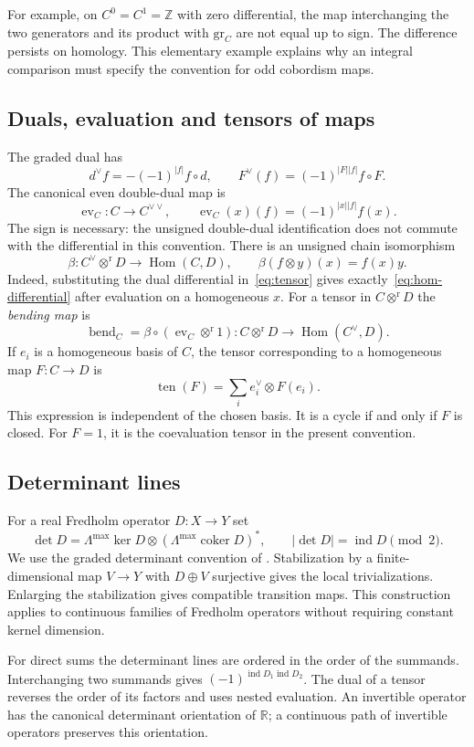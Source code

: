 \documentclass[11pt]{amsart}
\theoremstyle{definition}
\theoremstyle{remark}
\theoremstyle{plain}
\numberwithin{equation}{section}
\newcommand{\ZZ}{\mathbb Z}
\newcommand{\RR}{\mathbb R}
\newcommand{\eps}{\mathrm{gr}}
\newcommand{\ind}{\operatorname{ind}}
\newcommand{\coker}{\operatorname{coker}}
\newcommand{\Hom}{\operatorname{Hom}}
\newcommand{\ev}{\operatorname{ev}}
\newcommand{\ten}{\operatorname{ten}}
\begin{document}
For example, on $C^0=C^1=\ZZ$ with zero differential, the map
interchanging the two generators and its product with $\eps_C$
are not equal up to sign. The difference persists on homology.
This elementary example explains why an integral comparison
must specify the convention for odd cobordism maps.

\subsection{Duals, evaluation and tensors of maps}
The graded dual has
\[
 d^\vee f=-(-1)^{|f|}f\circ d,
 \qquad F^\vee(f)=(-1)^{|F||f|}f\circ F.
\]
The canonical even double-dual map is
\[
 \ev_C:C\longrightarrow C^{\vee\vee},\qquad
 \ev_C(x)(f)=(-1)^{|x||f|}f(x).
\]
The sign is necessary: the unsigned double-dual identification
does not commute with the differential in this convention.
There is an unsigned chain isomorphism
\begin{equation}\label{eq:beta}
 \beta:C^\vee\otimes^{\mathrm r} D\longrightarrow\Hom(C,D),\qquad
 \beta(f\otimes y)(x)=f(x)y.
\end{equation}
Indeed, substituting the dual differential in~\eqref{eq:tensor}
gives exactly~\eqref{eq:hom-differential} after evaluation on a
homogeneous $x$. For a tensor in $C\otimes^{\mathrm r} D$ the \emph{bending map} is
\[
 \operatorname{bend}_C=\beta\circ(\ev_C\otimes^{\mathrm r}1):
 C\otimes^{\mathrm r} D\longrightarrow\Hom(C^\vee,D).
\]
If $e_i$ is a homogeneous basis of $C$, the tensor corresponding
to a homogeneous map $F:C\to D$ is
\[
 \ten(F)=\sum_i e_i^\vee\otimes F(e_i).
\]
This expression is independent of the chosen basis. It is a
cycle if and only if $F$ is closed. For $F=1$, it is the
coevaluation tensor in the present convention.

\subsection{Determinant lines}
For a real Fredholm operator $D:X\to Y$ set
\[
 \det D=\Lambda^{\max}\ker D\otimes
       (\Lambda^{\max}\coker D)^*,\qquad
 |\det D|=\ind D\pmod2.
\]
We use the graded determinant convention of
\cite{Zinger}. Stabilization by a finite-dimensional map
$V\to Y$ with $D\oplus V$ surjective gives the local
trivializations. Enlarging the stabilization gives compatible
transition maps. This construction applies to continuous
families of Fredholm operators without requiring constant
kernel dimension.

For direct sums the determinant lines are ordered in the
order of the summands. Interchanging two summands gives
$(-1)^{\ind D_1\ind D_2}$. The dual of a tensor reverses
the order of its factors and uses nested evaluation. An
invertible operator has the canonical determinant orientation
of $\RR$; a continuous path of invertible operators preserves
this orientation.
\end{document}

